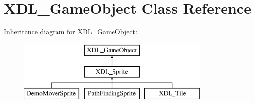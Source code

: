 \hypertarget{class_x_d_l___game_object}{\section{X\-D\-L\-\_\-\-Game\-Object Class Reference}
\label{class_x_d_l___game_object}
}
Inheritance diagram for X\-D\-L\-\_\-\-Game\-Object\-:\begin{figure}[H]
\begin{center}
\leavevmode
\includegraphics[height=3.000000cm]{class_x_d_l___game_object}
\end{center}
\end{figure}

